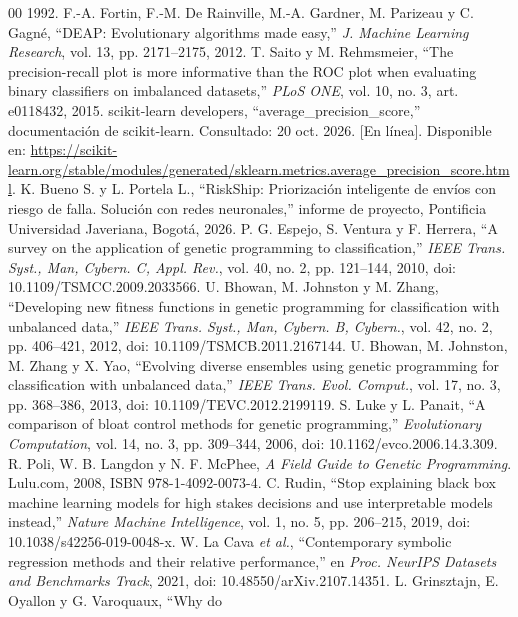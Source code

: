 \documentclass[conference]{IEEEtran}
\begin{document}
\begin{thebibliography}{00}
1992.
 F.-A. Fortin, F.-M. De Rainville, M.-A. Gardner, M. Parizeau y
C. Gagné, ``DEAP: Evolutionary algorithms made easy,'' \textit{J. Machine
Learning Research}, vol. 13, pp. 2171--2175, 2012.
 T. Saito y M. Rehmsmeier, ``The precision-recall plot is more
informative than the ROC plot when evaluating binary classifiers on imbalanced
datasets,'' \textit{PLoS ONE}, vol. 10, no. 3, art. e0118432, 2015.
 scikit-learn developers, ``average\_precision\_score,''
documentación de scikit-learn. Consultado: 20 oct. 2026. [En línea].
Disponible en: \url{https://scikit-learn.org/stable/modules/generated/sklearn.metrics.average_precision_score.html}.
 K. Bueno S. y L. Portela L., ``RiskShip: Priorización
inteligente de envíos con riesgo de falla. Solución con redes neuronales,''
informe de proyecto, Pontificia Universidad Javeriana, Bogotá, 2026.
 P. G. Espejo, S. Ventura y F. Herrera, ``A survey on the
application of genetic programming to classification,'' \textit{IEEE Trans.
Syst., Man, Cybern. C, Appl. Rev.}, vol. 40, no. 2, pp. 121--144, 2010,
doi: 10.1109/TSMCC.2009.2033566.
 U. Bhowan, M. Johnston y M. Zhang, ``Developing new
fitness functions in genetic programming for classification with unbalanced
data,'' \textit{IEEE Trans. Syst., Man, Cybern. B, Cybern.}, vol. 42, no. 2,
pp. 406--421, 2012, doi: 10.1109/TSMCB.2011.2167144.
 U. Bhowan, M. Johnston, M. Zhang y X. Yao, ``Evolving
diverse ensembles using genetic programming for classification with
unbalanced data,'' \textit{IEEE Trans. Evol. Comput.}, vol. 17, no. 3,
pp. 368--386, 2013, doi: 10.1109/TEVC.2012.2199119.
 S. Luke y L. Panait, ``A comparison of bloat control methods
for genetic programming,'' \textit{Evolutionary Computation}, vol. 14, no. 3,
pp. 309--344, 2006, doi: 10.1162/evco.2006.14.3.309.
 R. Poli, W. B. Langdon y N. F. McPhee, \textit{A Field Guide
to Genetic Programming}. Lulu.com, 2008, ISBN 978-1-4092-0073-4.
 C. Rudin, ``Stop explaining black box machine learning models
for high stakes decisions and use interpretable models instead,''
\textit{Nature Machine Intelligence}, vol. 1, no. 5, pp. 206--215, 2019,
doi: 10.1038/s42256-019-0048-x.
 W. La Cava \textit{et al.}, ``Contemporary symbolic
regression methods and their relative performance,'' en \textit{Proc. NeurIPS
Datasets and Benchmarks Track}, 2021, doi: 10.48550/arXiv.2107.14351.
 L. Grinsztajn, E. Oyallon y G. Varoquaux, ``Why do

\end{thebibliography}
\end{document}
